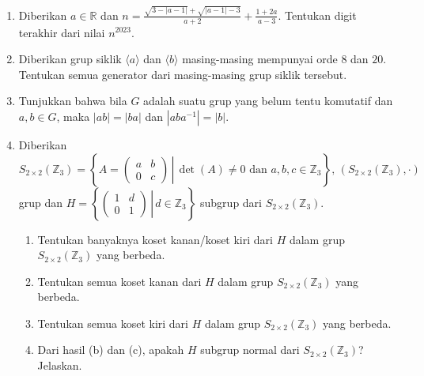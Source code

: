 \documentclass[10pt,openany,a4paper]{article}
\newcommand{\R}{\mathbb{R}}
\newcommand{\Z}{\mathbb{Z}}
\begin{document}
\begin{enumerate}
    \item Diberikan $a\in\R$ dan $\displaystyle n=\frac{\sqrt{3-|a-1|}+\sqrt{|a-1|-3}}{a+2}+\frac{1+2a}{a-3}$. Tentukan digit terakhir dari nilai $n^{2023}$.
    \item Diberikan grup siklik $\langle a\rangle$ dan $\langle b\rangle$ masing-masing mempunyai orde $8$ dan $20$. Tentukan semua generator dari masing-masing grup siklik tersebut.
    \item Tunjukkan bahwa bila $G$ adalah suatu grup yang belum tentu komutatif dan $a,b\in G$, maka $|ab|=|ba|$ dan $|aba^{-1}|=|b|$.
    \item Diberikan $S_{2\times 2}(\Z_3)=\left\{A=\left.\begin{pmatrix}a&b\\0&c\end{pmatrix}\,\right|\, \det(A)\ne 0 \text{ dan } a,b,c\in\Z_3\right\},\,(S_{2\times 2}(\Z_3),\cdot)$ grup dan $H=\left\{\left.\begin{pmatrix}1&d\\0&1\end{pmatrix}\,\right|\, d\in\Z_3\right\}$ subgrup dari $S_{2\times 2}(\Z_3)$. 
    \begin{enumerate}
        \item Tentukan banyaknya koset kanan/koset kiri dari $H$ dalam grup $S_{2\times 2}(\Z_3)$ yang berbeda.
        \item Tentukan semua koset kanan dari $H$ dalam grup $S_{2\times 2}(\Z_3)$ yang berbeda.
        \item Tentukan semua koset kiri dari $H$ dalam grup $S_{2\times 2}(\Z_3)$ yang berbeda.
        \item Dari hasil (b) dan (c), apakah $H$ subgrup normal dari $S_{2\times 2}(\Z_3)$? Jelaskan.
    \end{enumerate}
\end{enumerate}
\end{document}
